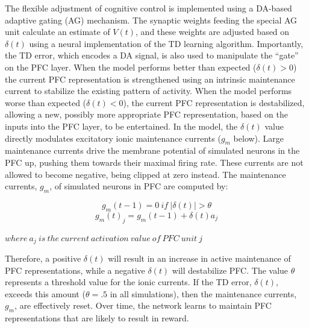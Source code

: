 The flexible adjustment of cognitive control is implemented using a
DA-based adaptive gating (AG) mechanism.  The synaptic weights feeding
the special AG unit calculate an estimate of $V(t)$, and these weights
are adjusted based on $\delta(t)$ using a neural implementation of the
TD learning algorithm.  Importantly, the TD error, which encodes a DA
signal, is also used to manipulate the ``gate'' on the PFC layer.
When the model performs better than expected ($\delta(t) > 0$) the
current PFC representation is strengthened using an intrinsic
maintenance current to stabilize the existing pattern of activity.
When the model performs worse than expected ($\delta(t) < 0$), the
current PFC representation is destabilized, allowing a new, possibly
more appropriate PFC representation, based on the inputs into the PFC
layer, to be entertained.  In the model, the \begin{math}\delta(t)\end{math} value directly modulates excitatory ionic maintenance currents (\begin{math}g_m\end{math} below).  Large maintenance currents drive the membrane potential of simulated neurons in the PFC up, pushing them towards their maximal firing rate.  These currents are not allowed to become negative, being clipped at zero instead.  The maintenance currents, $g_m$, of simulated neurons in PFC are computed by:

\begin{equation}g_m(t-1) = 0 ~if~ |\delta(t)| > \theta\end{equation}
\begin{equation}g_m(t)_j = g_m(t-1) + \delta(t) a_j\end{equation}
\begin{center}$where~a_j~is~the~current~activation~value~of~PFC~unit~j$\end{center}

Therefore, a positive \begin{math}\delta(t)\end{math} will result in an increase in active maintenance of PFC representations, while a negative \begin{math}\delta(t)\end{math} will destabilize PFC.  The value \begin{math}\theta\end{math} represents a threshold value for the ionic currents.  If the TD error, \begin{math}\delta(t)\end{math}, exceeds this amount (\begin{math}\theta = .5\end{math} in all simulations), then the maintenance currents, \begin{math}g_m\end{math}, are effectively reset.  Over time, the network learns to maintain PFC representations that are likely to result in reward.  


